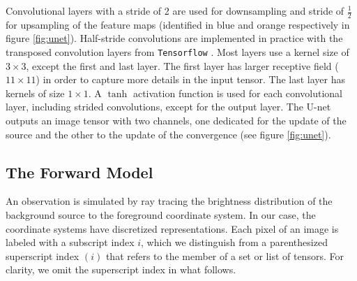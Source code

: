 Convolutional layers with a stride of 2 are used for downsampling and 
stride of $\frac{1}{2}$ for upsampling of the feature maps 
(identified in blue and orange respectively in figure \ref{fig:unet}). Half-stride convolutions are implemented in practice with the transposed convolution layers from \texttt{Tensorflow} \citep{tensorflow}.
Most layers use a kernel size of $3\times3$, except the first and last layer. 
The first layer has 
larger receptive field ($11\times11$) in order to capture more details in the input tensor. 
The last layer has kernels of size $1\times 1$. 
A $\tanh$ 
activation function is used 
for each convolutional layer, including strided convolutions, except for the output 
layer. The U-net outputs an image tensor with two channels, one dedicated for the update of the source 
and the other to the update of the convergence (see figure \ref{fig:unet}). 




\subsection{The Forward Model}\label{sec:forward model}

An observation is simulated by ray tracing the brightness distribution 
of the background source to the foreground coordinate system. 
In our case, the coordinate systems have discretized representations.
Each pixel of an image is labeled with a subscript index $i$, which 
we distinguish from a parenthesized superscript index $(i)$ that refers to 
the member of a set or list of tensors. For clarity, we omit 
the superscript index in what follows.

